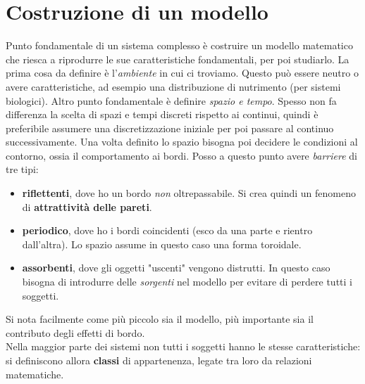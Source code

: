 \documentclass[12pt, a4paper]{article}
\theoremstyle{theorem}
\begin{document}
	\section{Costruzione di un modello}
		Punto fondamentale di un sistema complesso è costruire un modello matematico che riesca a riprodurre le sue caratteristiche fondamentali, per poi studiarlo.
		La prima cosa da definire è l'\textit{ambiente} in cui ci troviamo. Questo può essere neutro o avere caratteristiche, ad esempio una distribuzione di nutrimento (per sistemi biologici).
		Altro punto fondamentale è definire \textit{spazio e tempo}. Spesso non fa differenza la scelta di spazi e tempi discreti rispetto ai continui, quindi è preferibile assumere una discretizzazione iniziale per poi passare al continuo successivamente.
		Una volta definito lo spazio bisogna poi decidere le condizioni al contorno, ossia il comportamento ai bordi. 
		Posso a questo punto avere \textit{barriere} di tre tipi:
		\begin{itemize}
			\item \textbf{riflettenti}, dove ho un bordo \textit{non} oltrepassabile. Si crea quindi un fenomeno di \textbf{attrattività delle pareti}.
			\item \textbf{periodico}, dove ho i bordi coincidenti (esco da una parte e rientro dall'altra). Lo spazio assume in questo caso una forma toroidale.
			\item \textbf{assorbenti}, dove gli oggetti "uscenti" vengono distrutti. In questo caso bisogna di introdurre delle \textit{sorgenti} nel modello per evitare di perdere tutti i soggetti.
		\end{itemize}
		Si nota facilmente come più piccolo sia il modello, più importante sia il contributo degli effetti di bordo.\\
		Nella maggior parte dei sistemi non tutti i soggetti hanno le stesse caratteristiche: si definiscono allora \textbf{classi} di appartenenza, legate tra loro da relazioni matematiche.
\end{document}
